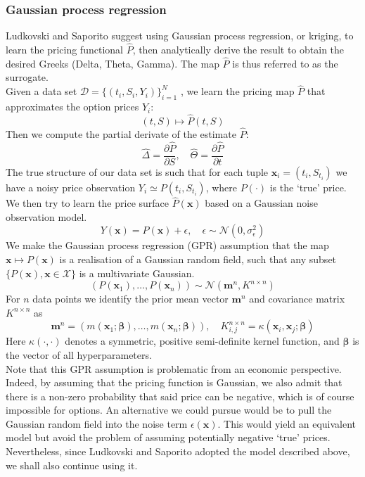 \documentclass[a4paper,12pt]{article}
\begin{document}
\subsubsection{Gaussian process regression}
Ludkovski and Saporito \cite{Ludkovski2020} suggest using Gaussian process regression, or kriging, to learn the pricing functional $\hat{P}$, then analytically derive the result to obtain the desired Greeks (Delta, Theta, Gamma). The map $\hat{P}$ is thus referred to as the surrogate.\\
Given a data set $\mathcal{D} = \{(t_i,S_i,Y_i) \}_{i=1}^N$ , we learn the pricing map $\hat{P}$ that approximates the option prices $Y_i$:
$$(t,S) \mapsto \hat{P}(t,S)$$
Then we compute the partial derivate of the estimate $\hat{P}$:
$$
\widehat{\Delta} = \frac{\partial \hat{P}}{\partial S}, \quad \widehat{\Theta} = \frac{\partial \hat{P}}{\partial t}
$$
The true structure of our data set is such that for each tuple $\mathbf{x}_i = (t_i,S_{t_i})$ we have a noisy price observation $Y_i \simeq P(t_i,S_{t_i})$, where $P(\cdot)$ is the `true' price. We then try to learn the price surface $\hat{P}(\mathbf{x})$ based on a Gaussian noise observation model.
$$ 
Y(\mathbf{x}) = P(\mathbf{x}) + \epsilon, \quad \epsilon \sim \mathcal{N}(0,\sigma^2_{\epsilon}) 
$$
We make the Gaussian process regression (GPR) assumption that the map $\mathbf{x}\mapsto P(\mathbf{x})$ is a realisation of a Gaussian random field, such that any subset $\{P(\mathbf{x}),\mathbf{x}\in \mathcal{X}\}$ is a multivariate Gaussian.
$$    
(P(\mathbf{x}_1),\dots,P(\mathbf{x}_n)) \sim \mathcal{N}(\mathbf{m}^n,K^{n \times n}) 
$$
For $n$ data points we identify the prior mean vector $\mathbf{m}^n$ and covariance matrix $K^{n \times n}$ as
$$ 
\mathbf{m}^n = (m(\mathbf{x}_1;\boldsymbol{\beta}), \dots,m(\mathbf{x}_n;\boldsymbol{\beta})), \quad
K^{n\times n}_{i,j} = \kappa(\mathbf{x}_i,\mathbf{x}_j;\boldsymbol{\beta})
$$
Here $\kappa(\cdot,\cdot)$ denotes a symmetric, positive semi-definite kernel function, and $\boldsymbol{\beta}$ is the vector of all hyperparameters.\\
Note that this GPR assumption is problematic from an economic perspective. Indeed, by assuming that the pricing function is Gaussian, we also admit that there is a non-zero probability that said price can be negative, which is of course impossible for options. An alternative we could pursue would be to pull the Gaussian random field into the noise term $\epsilon(\mathbf{x})$. This would yield an equivalent model but avoid the problem of assuming potentially negative `true' prices. Nevertheless, since Ludkovski and Saporito adopted the model described above, we shall also continue using it.\\
\end{document}
